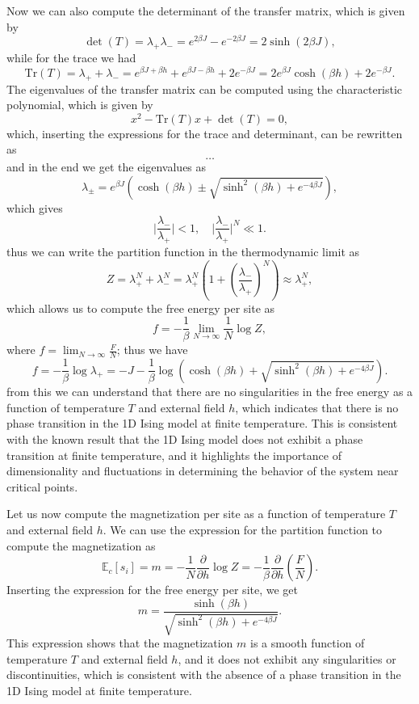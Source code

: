 Now we can also compute the determinant of the transfer matrix, which is given by
\[
    \det(T) = \lambda_+ \lambda_- = e^{2\beta J} - e^{-2\beta J} = 2 \sinh(2\beta J),
\]
while for the trace we had
\[
    \text{Tr}(T) = \lambda_+ + \lambda_- = e^{\beta J + \beta h} + e^{\beta J - \beta h} + 2 e^{-\beta J} = 2 e^{\beta J} \cosh(\beta h) + 2 e^{-\beta J}.
\]
The eigenvalues of the transfer matrix can be computed using the characteristic polynomial, which is given by
\[
    x^2 - \text{Tr}(T) x + \det(T) = 0,
\]
which, inserting the expressions for the trace and determinant, can be rewritten as
\[
    \dots
\]
and in the end we get the eigenvalues as
\[
    \lambda_{\pm} = e^{\beta J} \left(\cosh(\beta h) \pm \sqrt{\sinh^2(\beta h) + e^{-4\beta J}}\right),
\]
which gives
\[
    \vert \frac{\lambda_-}{\lambda_+} \vert <1 , \quad \vert \frac{\lambda_-}{\lambda_+} \vert^N \ll 1.
\]
thus we can write the partition function in the thermodynamic limit as
\[
    Z = \lambda_+^N + \lambda_-^N = \lambda_+^N \left(1 + \left(\frac{\lambda_-}{\lambda_+}\right)^N\right) \approx \lambda_+^N,
\]
which allows us to compute the free energy per site as
\[
    f = -\frac{1}{\beta} \lim_{N \to \infty} \frac{1}{N} \log Z,
\]
where \(f = \lim_{N \to \infty} \frac{F}{N}\); thus we have
\[
    f = -\frac{1}{\beta} \log \lambda_+ = -J - \frac{1}{\beta} \log\left( \cosh(\beta h) + \sqrt{\sinh^2(\beta h) + e^{-4\beta J}} \right).
\]
from this we can understand that there are no singularities in the free energy as a function of temperature \(T\) and external field \(h\), which indicates that there is no phase transition in the 1D Ising model at finite temperature. This is consistent with the known result that the 1D Ising model does not exhibit a phase transition at finite temperature, and it highlights the importance of dimensionality and fluctuations in determining the behavior of the system near critical points.

Let us now compute the magnetization per site as a function of temperature \(T\) and external field \(h\). We can use the expression for the partition function to compute the magnetization as
\[
    \mathbb{E}_{c}\left[s_i\right] = m = -\frac{1}{N} \frac{\partial}{\partial h} \log Z = -\frac{1}{\beta} \frac{\partial}{\partial h} (\frac{F}{N}).
\]
Inserting the expression for the free energy per site, we get
\[
    m = \frac{\sinh(\beta h)}{\sqrt{\sinh^2(\beta h) + e^{-4\beta J}}}.
\]
This expression shows that the magnetization \(m\) is a smooth function of temperature \(T\) and external field \(h\), and it does not exhibit any singularities or discontinuities, which is consistent with the absence of a phase transition in the 1D Ising model at finite temperature.

